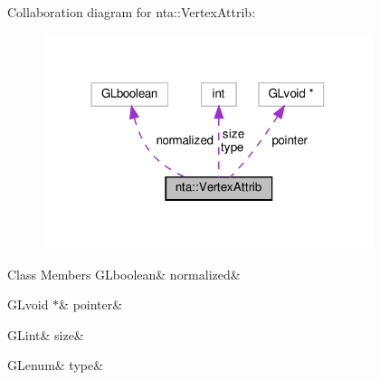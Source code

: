 Collaboration diagram for nta\+:\+:Vertex\+Attrib\+:\nopagebreak
\begin{figure}[H]
\begin{center}
\leavevmode
\includegraphics[width=273pt]{d6/d7d/structnta_1_1VertexAttrib__coll__graph}
\end{center}
\end{figure}
\begin{DoxyFields}{Class Members}
\mbox{\label{namespacenta_afe78648a02032d5ba376207cf322320a}} 
GLboolean&
normalized&
\\
\hline

\mbox{\label{namespacenta_a926cbe1d958dd6e72ad7f93e8791d9a4}} 
GLvoid $\ast$&
pointer&
\\
\hline

\mbox{\label{namespacenta_afd253a525c4d086bcc2afa66a2d0118e}} 
GLint&
size&
\\
\hline

\mbox{\label{namespacenta_a625cbe8f28739965a9ec29b9a426465e}} 
GLenum&
type&
\\
\hline

\end{DoxyFields}
